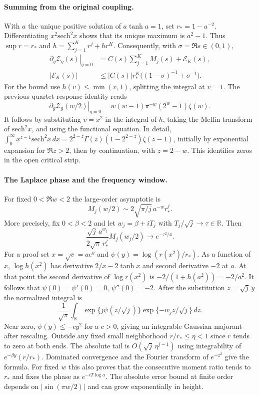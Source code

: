 \documentclass[11pt]{article}
\begin{document}
\paragraph{Summing from the original coupling.}
With $a$ the unique positive solution of $a\tanh a=1$, set
$r_* = 1-a^{-2}$. Differentiating $x^2\mathrm{sech}^2x$ shows that its
unique maximum is $a^2-1$. Thus $\sup r=r_*$ and
$h=\sum_{j=1}^{K}r^j+h r^K$. Consequently,
with $\sigma=\Re s\in(0,1)$,
\begin{align*}
 \left.\partial_g\mathcal Z_g(s)\right|_{g=0}
  &=C(s)\sum_{j=1}^{K}M_j(s)+\mathcal E_K(s),\\
 |\mathcal E_K(s)|&\le |C(s)|r_*^K\bigl((1-\sigma)^{-1}+\sigma^{-1}\bigr).
\end{align*}
For the bound use $h(v)\le\min(v,1)$, splitting the integral at $v=1$.
The previous quartet-response identity reads
\[
 \left.\partial_g\mathcal Z_g(w/2)\right|_{g=0}
 =w(w-1)\pi^{-w}(2^w-1)\zeta(w).
\]
It follows by substituting $v=x^2$ in the integral of $h$, taking the
Mellin transform of $\mathrm{sech}^2x$, and using the functional equation.
In detail,
$\int_0^\infty x^{z-1}\mathrm{sech}^2x\,dx
 =2^{2-z}\Gamma(z)(1-2^{2-z})\zeta(z-1)$,
initially by exponential expansion for $\Re z>2$, then by continuation,
with $z=2-w$. This identifies zeros in the open critical strip.

\paragraph{The Laplace phase and the frequency window.}
For fixed $0<\Re w<2$ the large-order asymptotic is
\[
 M_j(w/2)\sim 2\sqrt{\pi/j}\,a^{-w}r_*^j .
\]
More precisely, fix $0<\beta<2$ and let $w_j=\beta+iT_j$ with
$T_j/\sqrt j\longrightarrow\tau\in\mathbb R$. Then
\[
 \boxed{\displaystyle
 \frac{\sqrt j\,a^{w_j}}{2\sqrt\pi\,r_*^j}M_j(w_j/2)
 \longrightarrow e^{-\tau^2/4}.}
\]
For a proof set $x=\sqrt v=a e^y$ and $\psi(y)=\log(r(x^2)/r_*)$.
As a function of $x$, $\log h(x^2)$ has derivative $2/x-2\tanh x$ and
second derivative $-2$ at $a$. At that point the second derivative of
$\log r(x^2)$ is $-2/(1+h(a^2))=-2/a^2$. It follows that
$\psi(0)=\psi'(0)=0$, $\psi''(0)=-2$. After the substitution
$z=\sqrt j\,y$ the normalized integral is
\[
 \frac{1}{\sqrt\pi}\int_{\mathbb R}
 \exp\{j\psi(z/\sqrt j)\}\exp\{-w_j z/\sqrt j\}\,dz.
\]
Near zero, $\psi(y)\le-cy^2$ for a $c>0$, giving an integrable Gaussian
majorant after rescaling. Outside any fixed small neighborhood
$r/r_*\le\eta<1$ since $r$ tends to zero at both ends.
The absolute tail is $O(\sqrt j\,\eta^{j-1})$ using integrability of
$e^{-\beta y}(r/r_*)$. Dominated convergence and the Fourier transform of
$e^{-z^2}$ give the formula. For fixed $w$ this also proves that the
consecutive moment ratio tends to $r_*$ and fixes the phase as
$e^{-iT\log a}$. The absolute error bound at finite order depends on
$|\sin(\pi w/2)|$ and can grow exponentially in height.
\end{document}
